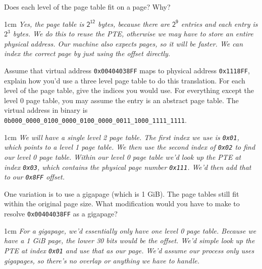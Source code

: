 \documentclass[12pt]{article}
\newenvironment{answer}{\begin{adjustwidth}{1cm}{}\itshape}{\end{adjustwidth}}
\begin{document}
\vspace{1em}

Does each level of the page table fit on a page? Why? 

\begin{answer}
  Yes, the page table is $\mathsf{2^{12}}$ bytes, because there are
  $\mathsf{2^9}$ entries and each entry is $2^3$ bytes.
  We do this to reuse the PTE, otherwise we may have to store an entire
  physical address. Our machine also expects pages, so it will be faster.
  We can index the correct page by just using the offset directly.
\end{answer}

\vspace{1em}

Assume that virtual address \lstinline|0x00404038FF|
maps to physical address \texttt{0x1118FF},
explain how you'd use a three level page table to do this translation.
For each level of the page table, give the indices you would use. For everything
except the level 0 page table, you may assume the entry is an abstract page table.
The virtual address in binary is
\lstinline|0b000_0000_0100_0000_0100_0000_0011_1000_1111_1111|.

\begin{answer}
  We will have a single level 2 page table. The first index we use is
  \texttt{0x01}, which points to a level 1 page table. We then use the second
  index of \texttt{0x02} to find our level 0 page table. Within our level 0
  page table we'd look up the PTE at index \texttt{0x03}, which contains the
  physical page number \texttt{0x111}. We'd then add that to our \texttt{0x8FF}
  offset.
\end{answer}

\vspace{1em}

One variation is to use a gigapage (which is 1 GiB). The page tables still fit
within the original page size. What modification would you have to make to resolve
\lstinline|0x00404038FF| as a gigapage?

\begin{answer}
  For a gigapage, we'd essentially only have one level 0 page table. Because we
  have a 1 GiB page, the lower 30 bits would be the offset. We'd simple look up
  the PTE at index \texttt{0x01} and use that as our page. We'd assume our
  process only uses gigapages, so there's no overlap or anything we have to
  handle.
\end{answer}

\newpage
\end{document}
